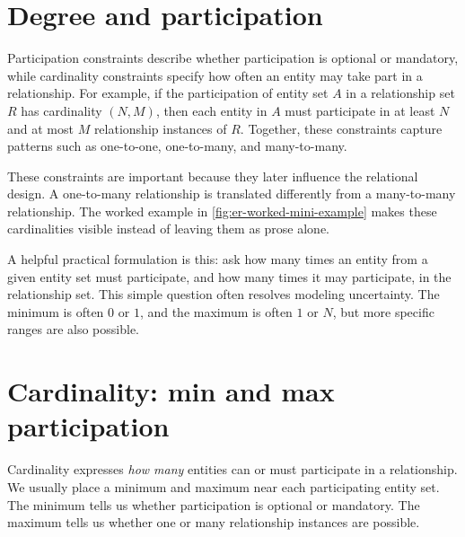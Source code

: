 \documentclass[11pt,a4paper,openany]{book}
\begin{document}
\section{Degree and participation}
Participation constraints describe whether participation is optional or mandatory, while cardinality constraints specify how often an entity may take part in a relationship. For example, if the participation of entity set \(A\) in a relationship set \(R\) has cardinality \((N,M)\), then each entity in \(A\) must participate in at least \(N\) and at most \(M\) relationship instances of \(R\). Together, these constraints capture patterns such as one-to-one, one-to-many, and many-to-many.

These constraints are important because they later influence the relational design. A one-to-many relationship is translated differently from a many-to-many relationship. The worked example in \cref{fig:er-worked-mini-example} makes these cardinalities visible instead of leaving them as prose alone.

A helpful practical formulation is this: ask how many times an entity from a given entity set must participate, and how many times it may participate, in the relationship set. This simple question often resolves modeling uncertainty. The minimum is often \(0\) or \(1\), and the maximum is often \(1\) or \(N\), but more specific ranges are also possible.

\section{Cardinality: min and max participation}
Cardinality expresses \emph{how many} entities can or must participate in a relationship. We usually place a minimum and maximum near each participating entity set. The minimum tells us whether participation is optional or mandatory. The maximum tells us whether one or many relationship instances are possible.
\end{document}
